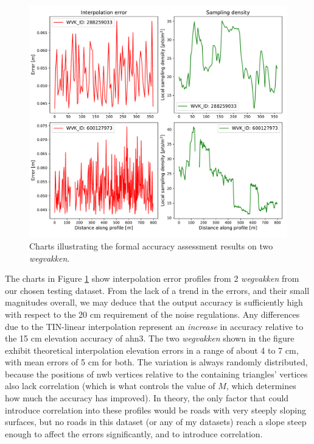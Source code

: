 \begin{figure}[h]
    \centering
    \includegraphics[width=0.85\linewidth]{final_report/figs/formalaccuracy0.pdf}
    \caption[Charts illustrating the formal accuracy assessment results on two LineStrings]{Charts illustrating the formal accuracy assessment results on two \textit{wegvakken}.}
    \label{fig:formalaccuracy0}
\end{figure}

The charts in Figure \ref{fig:formalaccuracy0} show interpolation error profiles from 2 \textit{wegvakken} from our chosen testing dataset. From the lack of a trend in the errors, and their small magnitudes overall, we may deduce that the output accuracy is sufficiently high with respect to the 20 cm requirement of the noise regulations. Any differences due to the TIN-linear interpolation represent an \textit{increase} in accuracy relative to the 15 cm elevation accuracy of \ac{ahn3}. The two \textit{wegvakken} shown in the figure exhibit theoretical interpolation elevation errors in a range of about 4 to 7 cm, with mean errors of 5 cm for both. The variation is always randomly distributed, because the positions of \ac{nwb} vertices relative to the containing triangles' vertices also lack correlation (which is what controls the value of $M$, which determines how much the accuracy has improved). In theory, the only factor that could introduce correlation into these profiles would be roads with very steeply sloping surfaces, but no roads in this dataset (or any of my datasets) reach a slope steep enough to affect the errors significantly, and to introduce correlation.

